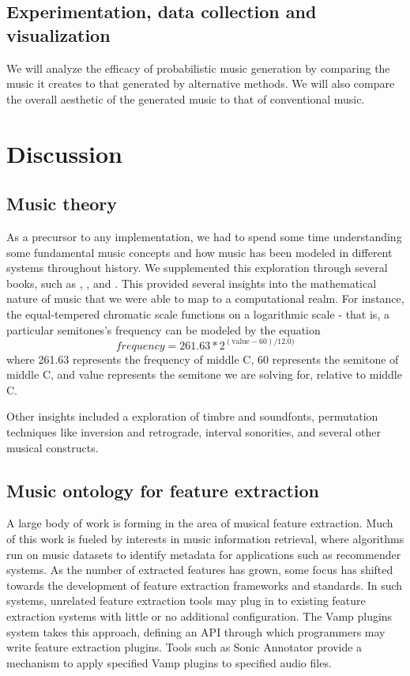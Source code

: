 \documentclass[11pt,conference,letterpaper]{IEEEtran}
\begin{document}
\subsection{Experimentation, data collection and visualization}

We will analyze the efficacy of probabilistic music generation by comparing the music it creates to that generated by alternative methods.  We will also compare the overall aesthetic of the generated music to that of conventional music.

\section{Discussion}

\subsection{Music theory}

As a precursor to any implementation, we had to spend some time understanding some fundamental music concepts and how music has been modeled in different systems throughout history. We supplemented this exploration through several books, such as \cite{temperly2007mprob}, \cite{krogerGeeksNerds}, and \cite{loy2006musimathics}. This provided several insights into the mathematical nature of music that we were able to map to a computational realm. For instance, the equal-tempered chromatic scale functions on a logarithmic scale - that is, a particular semitones's frequency can be modeled by the equation
{\small
	\[frequency = 261.63 * 2^{(\text{value} - 60) / 12.0)}\]
}
where 261.63 represents the frequency of middle C, 60 represents the semitone of middle C, and value represents the semitone we are solving for, relative to middle C.

Other insights included a exploration of timbre and soundfonts, permutation techniques like inversion and retrograde, interval sonorities, and several other musical constructs.

\subsection{Music ontology for feature extraction}

A large body of work is forming in the area of musical feature extraction. Much of this work is fueled by interests in music information retrieval, where algorithms run on music datasets to identify metadata for applications such as recommender systems. As the number of extracted features has grown, some focus has shifted towards the development of feature extraction frameworks and standards. In such systems, unrelated feature extraction tools may plug in to existing feature extraction systems with little or no additional configuration. The Vamp plugins system takes this approach, defining an API through which programmers may write feature extraction plugins. Tools such as Sonic Annotator provide a mechanism to apply specified Vamp plugins to specified audio files.
\end{document}
